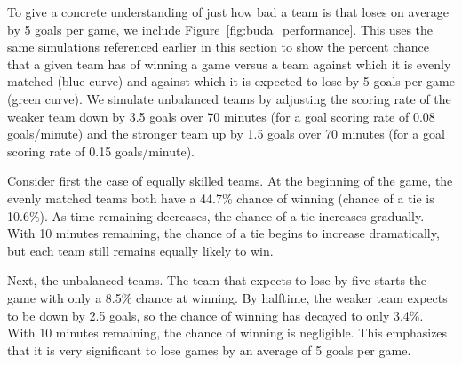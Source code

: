 To give a concrete understanding of just how bad a team is that loses on average by 5 goals per game, we include Figure~\ref{fig:buda_performance}.  This uses the same simulations referenced earlier in this section to show the percent chance that a given team has of winning a game versus a team against which it is evenly matched (blue curve) and against which it is expected to lose by 5 goals per game (green curve). We simulate unbalanced teams by adjusting the scoring rate of the weaker team down by 3.5 goals over 70 minutes (for a goal scoring rate of 0.08 goals/minute) and the stronger team up by 1.5 goals over 70 minutes (for a goal scoring rate of 0.15 goals/minute).

Consider first the case of equally skilled teams.  At the beginning of the game, the evenly matched teams both have a 44.7\% chance of winning (chance of a tie is 10.6\%). As time remaining decreases, the chance of a tie increases gradually. With 10 minutes remaining, the chance of a tie begins to increase dramatically, but each team still remains equally likely to win.

Next, the unbalanced teams.  The team that expects to lose by five starts the game with only a 8.5\% chance at winning.  By halftime, the weaker team expects to be down by 2.5 goals, so the chance of winning has decayed to only 3.4\%.  With 10 minutes remaining, the chance of winning is negligible. This emphasizes that it is very significant to lose games by an average of 5 goals per game.